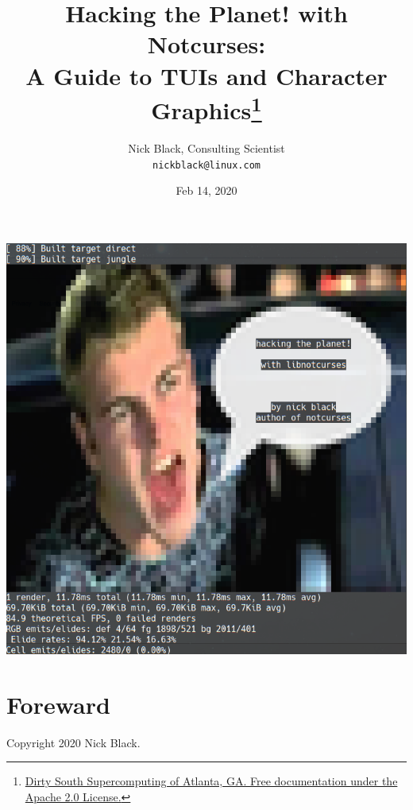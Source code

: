 \documentclass[letterpaper,10pt]{article}
\title{Hacking the Planet! with Notcurses:\\
A Guide to TUIs and Character Graphics\thanks{
 \href{https://www.dsscaw.com/}{Dirty South Supercomputing of Atlanta, GA. Free documentation under the Apache 2.0 License.}
}\\
}
\author{Nick Black, Consulting Scientist\\
\texttt{nickblack@linux.com}
}
\begin{document}
\date{Feb 14, 2020}
\maketitle
\date{}
\vspace{1in}
\begin{center}
\includegraphics[width=.75\linewidth]{htp-with-notcurses.png}
\end{center}
\thispagestyle{empty}

\clearpage
{}


\tableofcontents

\vspace*{.5in}
\section{Foreward}
Copyright 2020 Nick Black.
\end{document}
